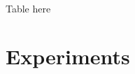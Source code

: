 \documentclass{article} %
\newcommand{\Holder}{H\"older\xspace}
\newcommand{\dataset}{\mathcal{D}}
\newcommand{\diag}[1]{\mathop{\textrm{diag}}\left(#1\right)}
\newcommand{\tauspace}{\mathcal{T}}
\newcommand{\red}[1]{{\color{red}#1}}
\def\btau{{\bm{\tau}}}
\def\eye{\mathbf{I}}
\def\bzeros{\mathbf{0}}
\def\proba{p}
\renewcommand{\Re}{\mathbb{R}}
\begin{document}
%
%
%


Table  here

\section{Experiments}  %
\end{document}
